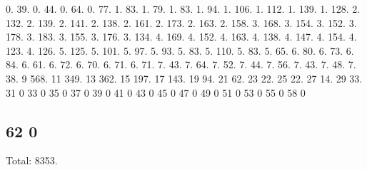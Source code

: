 0. 39. 0. 44. 0. 64. 0. 77. 1. 83. 1. 79. 1. 83. 1. 94. 1. 106. 1. 112. 1. 139. 1. 128. 2. 132. 2. 139. 2. 141. 2. 138. 2. 161. 2. 173. 2. 163. 2. 158. 3. 168. 3. 154. 3. 152. 3. 178. 3. 183. 3. 155. 3. 176. 3. 134. 4. 169. 4. 152. 4. 163. 4. 138. 4. 147. 4. 154. 4. 123. 4. 126. 5. 125. 5. 101. 5. 97. 5. 93. 5. 83. 5. 110. 5. 83. 5. 65. 6. 80. 6. 73. 6. 84. 6. 61. 6. 72. 6. 70. 6. 71. 6. 71. 7. 43. 7. 64. 7. 52. 7. 44. 7. 56. 7. 43. 7. 48. 7. 38. 9 568. 11 349. 13 362. 15 197. 17 143. 19 94. 21 62. 23 22. 25 22. 27 14. 29 33. 31 0 33 0 35 0 37 0 39 0 41 0 43 0 45 0 47 0 49 0 51 0 53 0 55 0 58 0 \subsection*{62 0 }

Total\+: 8353. 